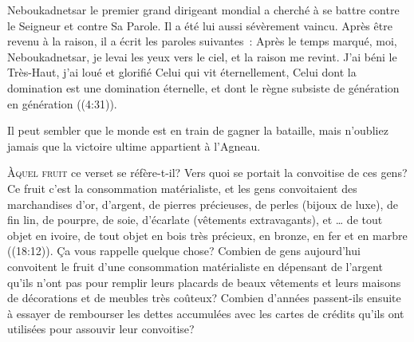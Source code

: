 
Neboukadnetsar \ocadr le premier grand dirigeant mondial \fcadr{}
 a cherché à se battre contre le Seigneur et contre Sa Parole.
 Il a été lui aussi sévèrement vaincu. Après être revenu à la raison,
 il a écrit les paroles suivantes~:
 \og Après le temps marqué, moi, Neboukadnetsar,
 je levai les yeux vers le ciel, et la raison me revint.
 J'ai béni le Très-Haut, j'ai loué et glorifié Celui qui vit éternellement,
 Celui dont la domination est une domination éternelle,
 et dont le règne subsiste de génération en génération \fg{}
 ((4:31)).

Il peut sembler que le monde est en train de gagner la bataille,
 mais n'oubliez jamais que la victoire ultime appartient à l'Agneau.

\dvrule






\lettrine{À}{quel fruit} ce verset se réfère-t-il?
 Vers quoi se portait la convoitise de ces gens?
 Ce fruit c'est la consommation matérialiste, et les gens convoitaient
 \og des marchandises d'or, d'argent, de pierres précieuses, de perles \fg{}
 (bijoux de luxe), \og de fin lin, de pourpre, de soie, d'écarlate \fg{}
 (vêtements extravagants), et \og \dots{} de tout objet en ivoire,
 de tout objet en bois très précieux, en bronze, en fer et en marbre \fg{}
 ((18:12)).
 Ça vous rappelle quelque chose? Combien de gens aujourd'hui convoitent
 le fruit d'une consommation matérialiste en dépensant de l'argent
 qu'ils n'ont pas pour remplir leurs placards de beaux vêtements
 et leurs maisons de décorations et de meubles très coûteux?
 Combien d'années passent-ils ensuite à essayer de rembourser
 les dettes accumulées avec les cartes de crédits
 qu'ils ont utilisées pour assouvir leur convoitise?

